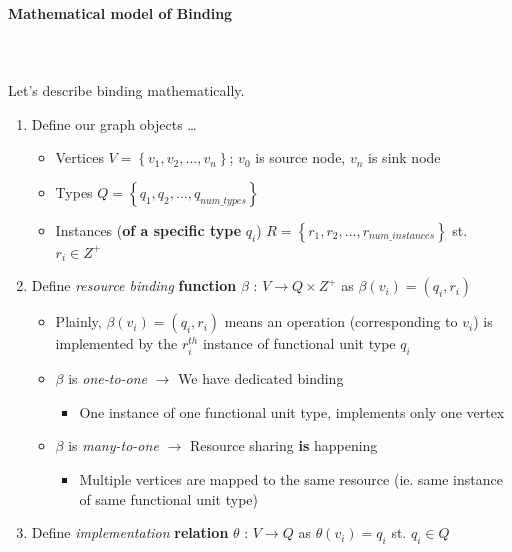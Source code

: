 \documentclass{article}
\begin{document}
\paragraph{Mathematical model of Binding}\mbox{}\\\\
Let's describe binding mathematically.

\begin{enumerate}
    \item 
    Define our graph objects \dots
    \begin{itemize}
        \item Vertices $V = \left\{ v_{1}, v_{2}, \dots, v_{n} \right\}$; $v_{0}$ is source node, $v_{n}$ is sink node
        \item Types $Q = \left\{ q_{1}, q_{2}, \dots, q_{num\_types} \right\}$
        \item Instances (\textbf{of a specific type} $q_{i}$) $R = \left\{ r_{1}, r_{2}, \dots, r_{num\_instances} \right\}$ st. $r_{i} \in Z^{+}$
    \end{itemize}
    \item Define \textit{resource binding} \textbf{function} $\beta$ : $V \xrightarrow{} Q\times Z^{+}$ as $\beta(v_{i}) = (q_{i},r_{i})$
        \begin{itemize}
            \item Plainly, $\beta(v_{i}) = (q_{i},r_{i})$ means an operation (corresponding to $v_{i}$) is implemented
                    by the $r_{i}^{th}$ instance of functional unit type $q_{i}$
            \item $\beta$ is \textit{one-to-one} $\longrightarrow$ We have dedicated binding
                \begin{itemize}
                    \item One instance of one functional unit type, implements only one vertex
                \end{itemize}
            \item $\beta$ is \textit{many-to-one} $\longrightarrow$ Resource sharing \textbf{is} happening
                \begin{itemize}
                    \item Multiple vertices are mapped to the same resource (ie. same instance of same functional unit type)
                \end{itemize}
        \end{itemize}
    \item Define \textit{implementation} \textbf{relation} $\theta$ : $V \xrightarrow{} Q$ as $\theta(v_{i}) = q_{i}$ st. $q_{i} \in Q$

\end{enumerate}
\end{document}

